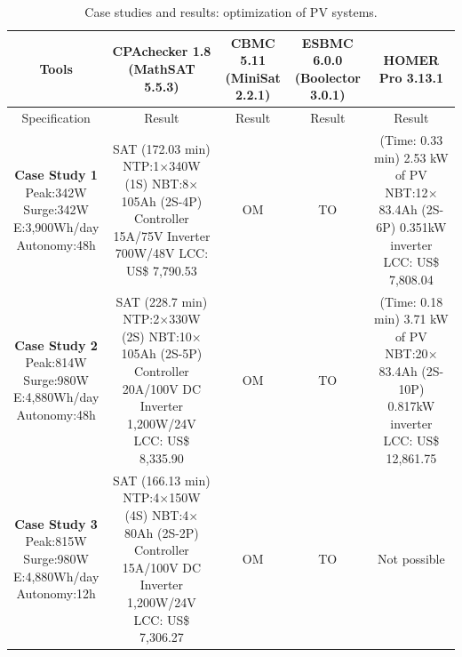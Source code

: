 \documentclass[runningheads]{llncs}
\begin{document}
\begin{table}[!t]
\caption{Case studies and results: optimization of PV systems.}\label{tab1}
\begin{tabular}{|c|c|c|c|c|}
\hline
\hline
Tools & \makecell{CPAchecker 1.8\\(MathSAT 5.5.3)}& \makecell{CBMC 5.11\\(MiniSat 2.2.1)} & \makecell {ESBMC 6.0.0\\(Boolector 3.0.1)} & HOMER Pro 3.13.1\\
\hline
\hline
Specification & Result & Result & Result & Result \\
\hline
\makecell{\textbf{Case Study 1}\\Peak:342W\\Surge:342W \\E:3,900Wh/day\\Autonomy:48h} & \makecell{SAT (172.03 min) \\NTP:1$\times$340W (1S)\\NBT:8$\times$105Ah (2S-4P)\\Controller 15A/75V\\Inverter 700W/48V\\LCC: US\$ 7,790.53} & OM & TO & \makecell{(Time: 0.33 min)\\2.53 kW of PV\\NBT:12$\times$83.4Ah (2S-6P)\\0.351kW inverter\\LCC: US\$ 7,808.04}\\
\hline
\makecell{\textbf{Case Study 2}\\Peak:814W\\Surge:980W\\E:4,880Wh/day\\Autonomy:48h} & \makecell {SAT (228.7 min) \\NTP:2$\times$330W (2S)\\NBT:10$\times$105Ah (2S-5P)\\Controller 20A/100V DC\\Inverter 1,200W/24V \\LCC: US\$ 8,335.90} & OM & TO & \makecell{(Time: 0.18 min)\\3.71 kW of PV\\NBT:20$\times$83.4Ah (2S-10P)\\0.817kW inverter\\LCC: US\$ 12,861.75} \\
\hline
\makecell{\textbf{Case Study 3}\\Peak:815W\\Surge:980W\\E:4,880Wh/day\\Autonomy:12h} & \makecell {SAT (166.13 min) \\NTP:4$\times$150W (4S)\\NBT:4$\times$80Ah (2S-2P)\\Controller 15A/100V DC\\Inverter 1,200W/24V \\LCC: US\$ 7,306.27} & OM & TO & Not possible \\

\end{tabular}
\end{table}
\end{document}
